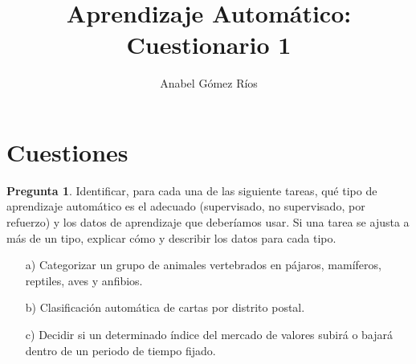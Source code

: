 \documentclass[12pt]{article}
\title{Aprendizaje Automático: Cuestionario 1}
\author{Anabel G\'omez R\'ios}
\theoremstyle{definition}
\begin{document}
\maketitle

\newtheorem{pregunta}{Pregunta}

\section{Cuestiones}
\begin{pregunta}
Identificar, para cada una de las siguiente tareas, qué tipo de aprendizaje automático es el adecuado (supervisado, no supervisado, por refuerzo) y los datos de aprendizaje que deberíamos usar. Si una tarea se ajusta a más de un tipo, explicar cómo y describir los datos para cada tipo.
\begin{enumerate}
\item[a)] Categorizar un grupo de animales vertebrados en pájaros, mamíferos, reptiles, aves y anfibios.
\item[b)] Clasificación automática de cartas por distrito postal.
\item[c)] Decidir si un determinado índice del mercado de valores subirá o bajará dentro de un periodo de tiempo fijado.
\end{enumerate}


\end{pregunta}
\end{document}
